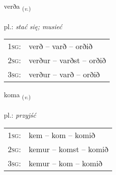 \documentclass[frontgrid, backgrid]{flacards}\usepackage[]{graphicx}\usepackage[]{xcolor}
\begin{document}
{verða \small{\textsubscript{(\textit{v.})}} \\[1ex] %
\textphonetic{[vɛrða]} \\
pl.: \emph{stać się; musieć} \\  [2ex]
\renewcommand*{\arraystretch}{0.8}
\begin{tabular}{p{1cm}l}
\textsc{1sg}: & verð -- varð -- orðið \\ 
\textsc{2sg}: & verður -- varðst -- orðið \\ 
\textsc{3sg}: & verður -- varð -- orðið \\ 
\end{tabular}
}

\renewcommand{\flhead}{\vskip5pt \fboxsep=0pt {\small\bfseries\footnotesize Sagnorð | Verb}}
\renewcommand{\fcfoot}{\vskip5pt \fboxsep=0pt \hspace{2pt}{\small\bfseries\footnotesize 1K}}

\renewcommand{\blhead}{\vskip5pt {\small\bfseries\footnotesize Sagnorð | Verb }}
\renewcommand{\bcfoot}{\vskip5pt \hspace{2pt}{\small\bfseries\footnotesize 1K}}


{koma \small{\textsubscript{(\textit{v.})}} \\[1ex] %
\textphonetic{[kʰɔːma]} \\
pl.: \emph{przyjść} \\  [2ex]
\renewcommand*{\arraystretch}{0.8}
\begin{tabular}{p{1cm}l}
\textsc{1sg}: & kem -- kom -- komið \\ 
\textsc{2sg}: & kemur -- komst -- komið \\ 
\textsc{3sg}: & kemur -- kom -- komið \\ 
\end{tabular}
}

\renewcommand{\flhead}{\vskip5pt \fboxsep=0pt {\small\bfseries\footnotesize Fornafn | Pronoun}}
\renewcommand{\fcfoot}{\vskip5pt \fboxsep=0pt \hspace{2pt}{\small\bfseries\footnotesize 1K}}
\end{document}
